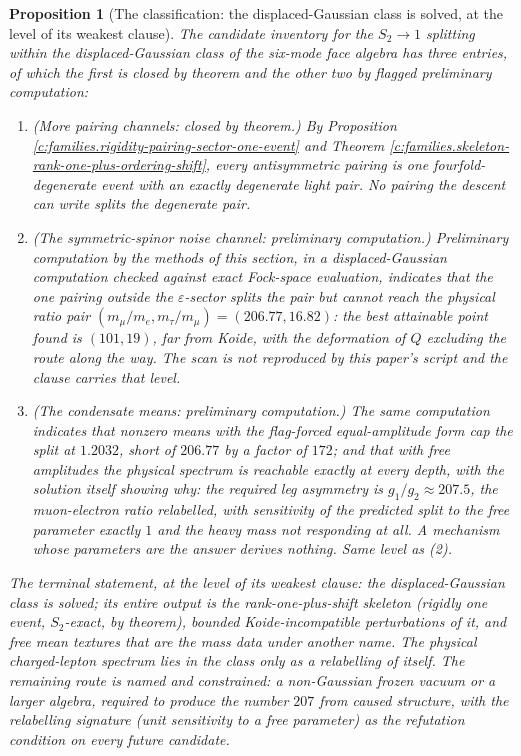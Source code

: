 \documentclass[11pt]{article}
\newtheorem{proposition}[theorem]{Proposition}
\theoremstyle{definition}
\theoremstyle{plain}
\begin{document}
\begin{proposition}[The classification: the displaced-Gaussian class is solved, at the level of its weakest clause]\label{c:families.classification-displaced-gaussian-class-solved-level}
The candidate inventory for the $S_{2} \to 1$ splitting within the displaced-Gaussian class of the six-mode face algebra has three entries, of which the first is closed by theorem and the other two by flagged preliminary computation:
\begin{enumerate}
\item \emph{(More pairing channels: closed by theorem.)} By Proposition \ref{c:families.rigidity-pairing-sector-one-event} and Theorem \ref{c:families.skeleton-rank-one-plus-ordering-shift}, every antisymmetric pairing is one fourfold-degenerate event with an exactly degenerate light pair. No pairing the descent can write splits the degenerate pair.
\item \emph{(The symmetric-spinor noise channel: preliminary computation.)} Preliminary computation by the methods of this section, in a displaced-Gaussian computation checked against exact Fock-space evaluation, indicates that the one pairing outside the $\varepsilon$-sector splits the pair but cannot reach the physical ratio pair $(m_{\mu}/m_{e}, m_{\tau}/m_{\mu}) = (206.77, 16.82)$: the best attainable point found is $(101, 19)$, far from Koide, with the deformation of $Q$ excluding the route along the way. The scan is not reproduced by this paper's script and the clause carries that level.
\item \emph{(The condensate means: preliminary computation.)} The same computation indicates that nonzero means with the flag-forced equal-amplitude form cap the split at $1.2032$, short of $206.77$ by a factor of $172$; and that with free amplitudes the physical spectrum is reachable exactly at every depth, with the solution itself showing why: the required leg asymmetry is $g_{1}/g_{2} \approx 207.5$, the muon-electron ratio relabelled, with sensitivity of the predicted split to the free parameter exactly $1$ and the heavy mass not responding at all. A mechanism whose parameters are the answer derives nothing. Same level as (2).
\end{enumerate}
The terminal statement, at the level of its weakest clause: the displaced-Gaussian class is solved; its entire output is the rank-one-plus-shift skeleton (rigidly one event, $S_{2}$-exact, by theorem), bounded Koide-incompatible perturbations of it, and free mean textures that are the mass data under another name. The physical charged-lepton spectrum lies in the class only as a relabelling of itself. The remaining route is named and constrained: a non-Gaussian frozen vacuum or a larger algebra, required to produce the number $207$ from caused structure, with the relabelling signature (unit sensitivity to a free parameter) as the refutation condition on every future candidate.
\end{proposition}
\end{document}
